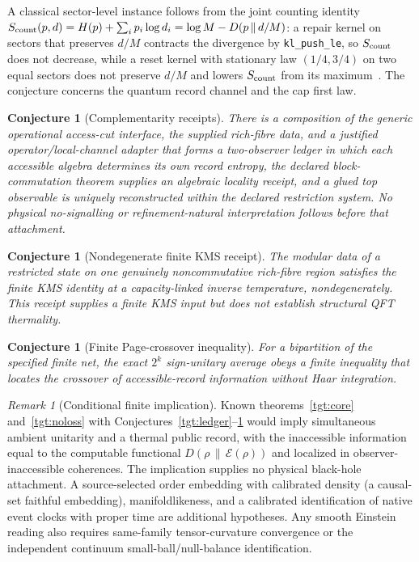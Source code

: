 \documentclass[11pt]{article}
\newtheorem{conjecture}[theorem]{Conjecture}
\theoremstyle{remark}
\newtheorem{remark}[theorem]{Remark}
\newcommand{\KL}[2]{D\!\left(#1\,\middle\|\,#2\right)}
\begin{document}
A classical sector-level instance follows from the joint counting identity
\(S_{\rm count}(p,d)=H(p)+\sum_ip_i\log d_i=\log M-\KL{p}{d/M}\): a repair
kernel on sectors that preserves \(d/M\) contracts the divergence by
\texttt{kl\_push\_le}, so \(S_{\rm count}\) does not decrease, while a reset
kernel with stationary law \((1/4,3/4)\) on two equal sectors does not
preserve \(d/M\) and lowers \(S_{\rm count}\) from its maximum~\cite{ophentropy}.
The conjecture concerns the quantum record channel and the cap first law.

\begin{conjecture}[Complementarity receipts]
There is a composition of the generic operational access-cut interface, the
supplied rich-fibre data, and a justified operator/local-channel adapter
that forms a two-observer ledger in which each accessible algebra determines its own
record entropy, the declared block-commutation theorem supplies an algebraic
locality receipt, and a glued top observable is uniquely reconstructed within
the declared restriction system. No physical no-signalling or
refinement-natural interpretation follows before that attachment.
\end{conjecture}

\begin{conjecture}[Nondegenerate finite KMS receipt]
\label{tgt:kms}
The modular data of a restricted state on one genuinely noncommutative
rich-fibre region satisfies the finite KMS identity at a capacity-linked
inverse temperature, nondegenerately. This receipt supplies a finite KMS
input but does not establish structural QFT thermality.
\end{conjecture}

\begin{conjecture}[Finite Page-crossover inequality]
For a bipartition of the specified finite net, the exact $2^{k}$ sign-unitary
average obeys a finite inequality that locates the crossover of
accessible-record information without Haar integration.
\end{conjecture}

\begin{remark}[Conditional finite implication]
Known theorems~\ref{tgt:core} and~\ref{tgt:noloss} with Conjectures~\ref{tgt:ledger}--\ref{tgt:kms} would imply simultaneous ambient
unitarity and a thermal public record, with the inaccessible information equal
to the computable functional $\KL{\rho}{\mathcal E(\rho)}$ and localized in
observer-inaccessible coherences. The implication supplies no physical
black-hole attachment. A source-selected order embedding with calibrated
density (a causal-set faithful embedding), manifoldlikeness, and a
calibrated identification of native event clocks with proper time are
additional hypotheses. Any smooth Einstein reading
also requires same-family tensor-curvature convergence or the independent
continuum small-ball/null-balance identification.
\end{remark}
\end{document}
